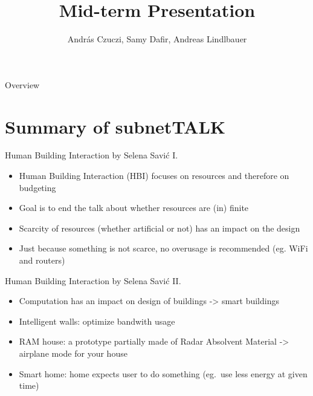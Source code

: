 \documentclass[10pt]{beamer}
\title{Mid-term Presentation}
\author{András Czuczi, Samy Dafir, Andreas Lindlbauer} %
\date{}
\begin{document}
\begin{frame}
	\maketitle 
\end{frame}


\begin{frame}{Overview}
	\tableofcontents
\end{frame}


\section{Summary of subnetTALK}


\begin{frame}{Human Building Interaction by Selena Savić I.} %
	\begin{itemize}
        \pause{}
		\item Human Building Interaction (HBI) focuses on resources and therefore on budgeting
		\pause{}
		\item Goal is to end the talk about whether resources are (in) finite
		\pause{}
		\item Scarcity of resources (whether artificial or not) has an impact on the design
		\pause{}
		\item Just because something is not scarce, no overusage is recommended (eg. WiFi and routers)
	\end{itemize}	
\end{frame}


\begin{frame}{Human Building Interaction by Selena Savić II.} %
	\begin{itemize}
        \pause{}
		\item Computation has an impact on design of buildings -> smart buildings
		\pause{}
		\item Intelligent walls: optimize bandwith usage
		\pause{}
		\item RAM house: a prototype partially made of Radar Absolvent Material -> airplane mode for your house
		\pause{}
		\item Smart home: home expects user to do something (eg.\ use less energy at given time)
	\end{itemize}	
\end{frame}
\end{document}
